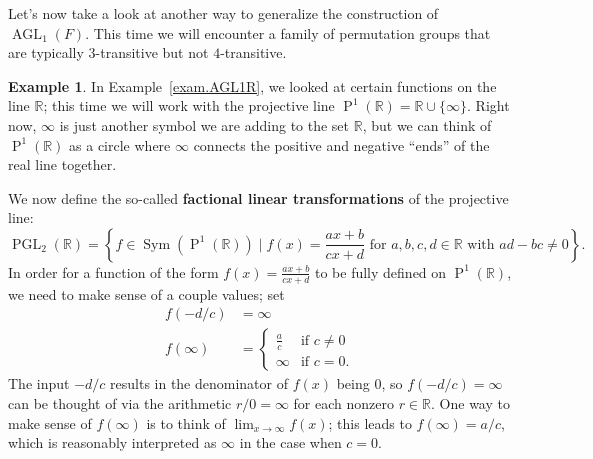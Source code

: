\documentclass[11pt]{amsart}
\theoremstyle{plain}
\theoremstyle{definition}
\newtheorem{example}{Example}
\theoremstyle{remark}
\DeclareMathOperator{\Sym}{Sym}
\DeclareMathOperator{\AGL}{AGL}
\DeclareMathOperator{\PGL}{PGL}
\DeclareMathOperator{\Proj}{P}
\begin{document}
Let's now take a look at another way to generalize the construction of $\AGL_1(F)$. This time we will encounter a family of permutation groups that are typically $3$-transitive but not $4$-transitive.

\begin{example}\label{exam.PGL1R}
In Example~\ref{exam.AGL1R}, we looked at certain functions on the line $\mathbb{R}$; this time we will work with the projective line $\Proj^1(\mathbb{R}) = \mathbb{R} \cup \{\infty\}$. Right now, $\infty$ is just another symbol we are adding to the set $\mathbb{R}$, but we can think of $\Proj^1(\mathbb{R})$ as a circle where $\infty$ connects the positive and negative ``ends'' of the real line together.
\begin{center}
\end{center}

We now define the so-called \textbf{factional linear transformations} of  the projective line:
\[\PGL_2(\mathbb{R}) = \left\{ f \in \Sym(\Proj^1(\mathbb{R})) \mid \text{$f(x) = \frac{ax+b}{cx+d}$ for $a,b,c,d\in \mathbb{R}$ with $ad-bc\neq 0$}\right\}.\]
In order for a function of the form $f(x) = \frac{ax+b}{cx+d}$ to be fully defined  on $\Proj^1(\mathbb{R})$, we need to make sense of a couple values; set 
\begin{align*}
f(-d/c) &= \infty\\
f(\infty) &= \begin{cases} \frac{a}{c} &  \text{if $c\neq 0$}\\ \infty &  \text{if $c= 0$}.\end{cases}
\end{align*}
The input $-d/c$ results in the denominator of $f(x)$ being $0$, so $f(-d/c) = \infty$ can be thought of via the arithmetic $r/0 = \infty$ for each nonzero $r\in \mathbb{R}$. One way to make sense of $f(\infty)$ is to think of $\lim_{x\rightarrow \infty} f(x)$; this leads to $f(\infty) = a/c$, which is reasonably interpreted as $\infty$ in the case when $c=0$.


\end{example}
\end{document}

